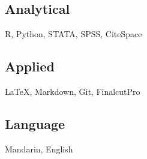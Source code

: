 \documentclass[11pt,a4paper]{article}
\begin{document}
\subsection*{Analytical}
\begin{spacing}{1}
R, Python, STATA, SPSS, CiteSpace
\end{spacing}

\subsection*{Applied}
\begin{spacing}{1}
\LaTeX, Markdown, Git, FinalcutPro
\end{spacing}

\subsection*{Language}
\begin{spacing}{1}
Mandarin, English
\end{spacing}
\end{document}
